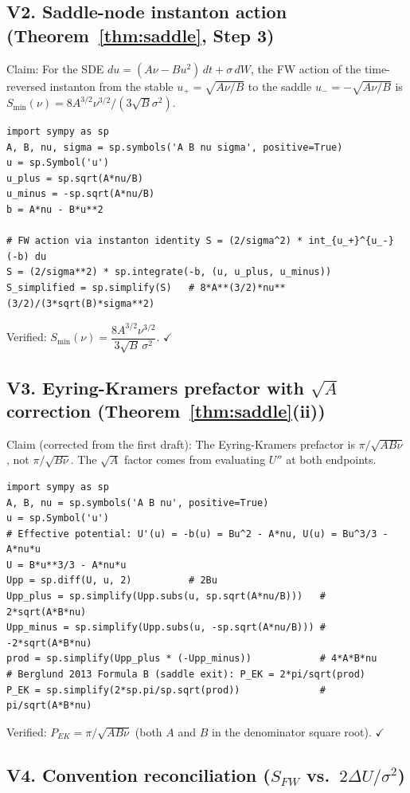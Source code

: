 \documentclass[11pt,a4paper]{article}
\theoremstyle{plain}
\theoremstyle{definition}
\begin{document}
\subsection*{V2. Saddle-node instanton action (Theorem~\ref{thm:saddle}, Step 3)}

Claim: For the SDE $du = (A\nu - Bu^2)\,dt + \sigma\,dW$, the FW action of the time-reversed instanton from the stable $u_+ = \sqrt{A\nu/B}$ to the saddle $u_- = -\sqrt{A\nu/B}$ is $S_{\min}(\nu) = 8 A^{3/2}\nu^{3/2}/(3\sqrt{B}\sigma^2)$.

\begin{verbatim}
import sympy as sp
A, B, nu, sigma = sp.symbols('A B nu sigma', positive=True)
u = sp.Symbol('u')
u_plus = sp.sqrt(A*nu/B)
u_minus = -sp.sqrt(A*nu/B)
b = A*nu - B*u**2

# FW action via instanton identity S = (2/sigma^2) * int_{u_+}^{u_-} (-b) du
S = (2/sigma**2) * sp.integrate(-b, (u, u_plus, u_minus))
S_simplified = sp.simplify(S)   # 8*A**(3/2)*nu**(3/2)/(3*sqrt(B)*sigma**2)
\end{verbatim}
Verified: $S_{\min}(\nu) = \dfrac{8 A^{3/2}\nu^{3/2}}{3\sqrt B\,\sigma^2}$. $\checkmark$

\subsection*{V3. Eyring-Kramers prefactor with $\sqrt A$ correction (Theorem~\ref{thm:saddle}(ii))}

Claim (corrected from the first draft): The Eyring-Kramers prefactor is $\pi/\sqrt{AB\nu}$, not $\pi/\sqrt{B\nu}$. The $\sqrt A$ factor comes from evaluating $U''$ at both endpoints.

\begin{verbatim}
import sympy as sp
A, B, nu = sp.symbols('A B nu', positive=True)
u = sp.Symbol('u')
# Effective potential: U'(u) = -b(u) = Bu^2 - A*nu, U(u) = Bu^3/3 - A*nu*u
U = B*u**3/3 - A*nu*u
Upp = sp.diff(U, u, 2)          # 2Bu
Upp_plus = sp.simplify(Upp.subs(u, sp.sqrt(A*nu/B)))   # 2*sqrt(A*B*nu)
Upp_minus = sp.simplify(Upp.subs(u, -sp.sqrt(A*nu/B))) # -2*sqrt(A*B*nu)
prod = sp.simplify(Upp_plus * (-Upp_minus))            # 4*A*B*nu
# Berglund 2013 Formula B (saddle exit): P_EK = 2*pi/sqrt(prod)
P_EK = sp.simplify(2*sp.pi/sp.sqrt(prod))              # pi/sqrt(A*B*nu)
\end{verbatim}
Verified: $P_{EK} = \pi/\sqrt{AB\nu}$ (both $A$ and $B$ in the denominator square root). $\checkmark$

\subsection*{V4. Convention reconciliation ($S_{FW}$ vs.\ $2\Delta U/\sigma^2$)}
\end{document}
